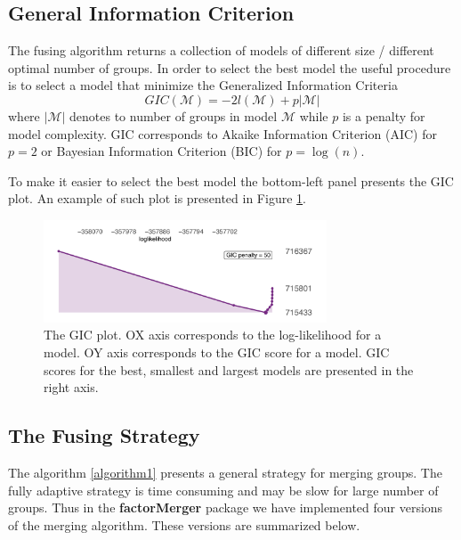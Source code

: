 \documentclass[12pt]{article}
\newcommand{\factorMerger}{\textbf{factorMerger }}
\newcommand{\M}{\mathcal{M}}
\begin{document}
\clearpage

\subsection{General Information Criterion}

The fusing algorithm returns a collection of models of different size / different optimal number of groups. In order to select the best model the useful procedure is to select a model that minimize the Generalized Information Criteria
$$
GIC(\M) = -2 l(\M) + p |\M|
$$
where $|\M|$ denotes to number of groups in model $\M$ while $p$ is a penalty for model complexity. GIC corresponds to Akaike Information Criterion (AIC) for $p=2$ or Bayesian Information Criterion (BIC) for $p=\log(n)$.

To make it easier to select the best model the bottom-left panel presents the GIC plot. An example of such plot is presented in Figure \ref{fig:FM0}.

\begin{figure}[h!tbp]
\centering
\includegraphics[width=0.75\textwidth]{FM_0}
\caption{\label{fig:FM0}
The GIC plot. OX axis corresponds to the log-likelihood for a model. OY axis corresponds to the GIC score for a model. GIC scores for the best, smallest and largest models are presented in the right axis.}
\end{figure}

\subsection{The Fusing Strategy}

The algorithm \ref{algorithm1} presents a general strategy for merging groups. The fully adaptive strategy is time consuming and may be slow for large number of groups. Thus in the \factorMerger package we have implemented four versions of the merging algorithm. These versions are summarized below.
\end{document}

